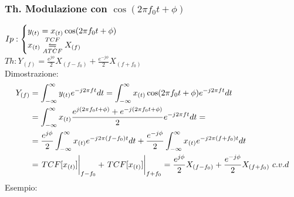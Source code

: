         \subsubsection{Th. Modulazione con $\cos(2\pi f_0t + \phi)$}\label{Modulazione con coseno generico}
            $Ip: \begin{cases}
                y_{(t)}= x_{(t)}\cos(2\pi f_0t + \phi)\\        
                x_{(t)}\overunderset{TCF}{ATCF}{\leftrightharpoons} X_{(f)}
                \end{cases}$\\
            $Th: Y_{(f)} = \frac{e^{j\phi}}{2} X_{(f-f_0)} + \frac{e^{-j\phi}}{2} X_{(f+f_0)} $ \\
            Dimostrazione: 
            \begin{align}
                Y_{(f)} & = \int_{-\infty}^{\infty} y_{(t)} e^{-j2\pi ft} dt = \int_{-\infty}^{\infty} x_{(t)}\cos(2\pi f_0t + \phi) e^{-j2\pi ft} dt \nonumber \\
                & =\int_{-\infty}^{\infty} x_{(t)} \frac{e^{j(2\pi f_0t+ \phi)} + e^{-j(2\pi f_0t+ \phi)}}{2} e^{-j2\pi ft} dt =  \nonumber \\
                & = \frac{e^{j\phi}}{2} \int_{-\infty}^{\infty} x_{(t)} e^{-j2\pi (f-f_0)t} dt + \frac{e^{-j\phi}}{2} \int_{-\infty}^{\infty} x_{(t)} e^{-j2\pi (f+f_0)t} dt \nonumber \\
                & = \eval{TCF[x_{(t)}]}_{f-f_0} + \eval{TCF[x_{(t)}]}_{f+f_0} = \frac{e^{j\phi}}{2} X_{(f-f_0)} + \frac{e^{-j\phi}}{2} X_{(f+f_0)}\ c.v.d \nonumber  
            \end{align}
            Esempio:
